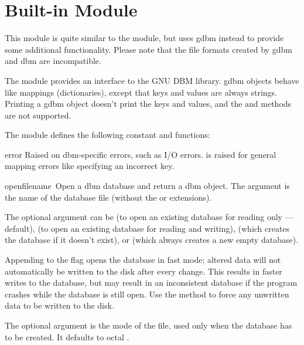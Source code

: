 \section{Built-in Module }
\label{module-gdbm}

This module is quite similar to the  module, but uses {\sc gdbm}
instead to provide some additional functionality.  Please note that
the file formats created by {\sc gdbm} and dbm are incompatible.

The  module provides an interface to the GNU DBM
library.  {\sc gdbm} objects behave like mappings
(dictionaries), except that keys and values are always strings.
Printing a {\sc gdbm} object doesn't print the keys and values, and the
 and  methods are not supported.

The module defines the following constant and functions:

\renewcommand{\indexsubitem}{(in module dbm)}
\begin{excdesc}{error}
Raised on dbm-specific errors, such as I/O errors.  is
raised for general mapping errors like specifying an incorrect key.
\end{excdesc}

\begin{funcdesc}{open}{filename\, }
Open a dbm database and return a dbm object.  The 
argument is the name of the database file (without the  or
 extensions).

The optional  argument can be
 (to open an existing database for reading only --- default),
 (to open an existing database for reading and writing),
 (which creates the database if it doesn't exist), or
 (which always creates a new empty database).

Appending  to the flag opens the database in fast mode;
altered data will not automatically be written to the disk after every
change.  This results in faster writes to the database, but may result
in an inconsistent database if the program crashes while the database
is still open.  Use the  method to force any unwritten
data to be written to the disk.

The optional  argument is the \UNIX{} mode of the file, used
only when the database has to be created.  It defaults to octal
.
\end{funcdesc}

